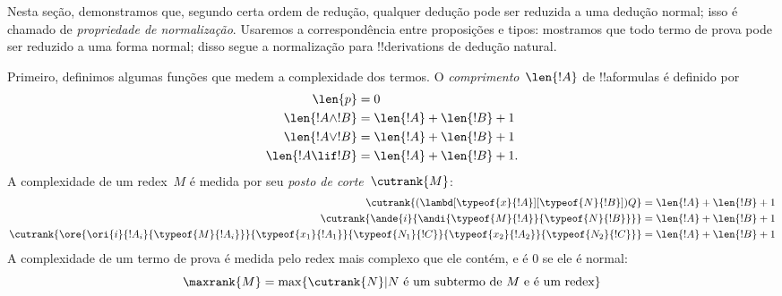 \documentclass[../../../include/open-logic-section]{subfiles}
\begin{document}


Nesta seção, demonstramos que, segundo certa ordem de redução, qualquer
dedução pode ser reduzida a uma dedução normal; isso é chamado de
\emph{propriedade de normalização}. Usaremos a correspondência entre
proposições e tipos: mostramos que todo termo de prova pode ser reduzido
a uma forma normal; disso segue a normalização para !!{derivation}s de
dedução natural.

Primeiro, definimos algumas funções que medem a complexidade dos termos.
O \emph{comprimento}~$\len{!A}$ de !!a{formula}s é definido por
\begin{align*}
  \len{p} &= 0\\
  \len{!A \land !B} &= \len{!A} + \len{!B} + 1\\
  \len{!A \lor !B} &= \len{!A} + \len{!B} + 1 \\
  \len{!A \lif !B} &= \len{!A} + \len{!B} + 1.
\end{align*}
A complexidade de um redex~$M$ é medida por seu \emph{posto de
  corte}~$\cutrank{M}$:
\begin{align*}
  \cutrank{(\lambd[\typeof{x}{!A}][\typeof{N}{!B}])Q} &=
  \len{!A} + \len{!B} + 1 \\
  \cutrank{\ande{i}{\andi{\typeof{M}{!A}}{\typeof{N}{!B}}}} &=
  \len{!A} + \len{!B} + 1 \\
  \cutrank{\ore{\ori{i}{!A_{i}}{\typeof{M}{!A_i}}}
    {\typeof{x_1}{!A_1}}{\typeof{N_1}{!C}}
    {\typeof{x_2}{!A_2}}{\typeof{N_2}{!C}}} &=
  \len{!A} + \len{!B} + 1
\end{align*}
A complexidade de um termo de prova é medida pelo redex mais complexo
que ele contém, e é $0$ se ele é normal:
\[
  \maxrank{M} = \max \{\cutrank{N} | N \text{ é um subtermo de } M \text{
    e é um redex}\}
\]
\end{document}
